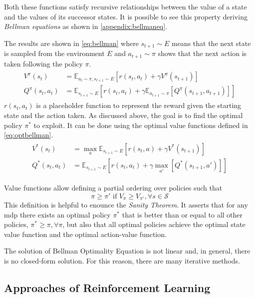 Both these functions satisfy recursive relationships between the value of a state and the values of its successor states. It is possible to see this property deriving \textit{Bellman equations} as shown in \vref{appendix:bellmaneq}.

The results are shown in \vref{eq:bellman} where $s_{t+1}\sim \mathit{E}$ means that the next state is sampled from the environment $E$ and $a_{t+1}\sim \pi$ shows that the next action is taken following the policy $\pi$.
\begin{align} \label{eq:bellman}
	\begin{split}
V^\pi(s_t) &= \mathbb{E}_{a_t \sim \pi, s_{t+1} \sim E}[r(s_t, a_t) + \gamma V^\pi(s_{t+1})] \\
Q^\pi(s_t,a_t) &= \mathbb{E}_{s_{t+1} \sim E}[r(s_t, a_t) + \gamma \mathbb{E}_{ a_{t+1} \sim \pi}[Q^\pi(s_{t+1}, a_{t+1})]]
\end{split}
\end{align}
 $r(s_t, a_t)$ is a placeholder function to represent the reward given the starting state and the action taken.
As discussed above, the goal is to find the optimal policy $\pi^*$ to exploit. It can be done using the optimal value functions defined in \vref{eq:optbellman}. 
\begin{align} \label{eq:optbellman}
\begin{split}
V^*(s_t) &= \max_{a} \mathbb{E}_{s_{t+1} \sim E}[r(s_t, a) + \gamma V^*(s_{t+1})] \\
Q^*(s_t,a_t) &= \mathbb{E}_{s_{t+1} \sim E}[r(s_t, a_t) + \gamma \max_{a'}[Q^*(s_{t+1}, a')]]
\end{split}
\end{align}

Value functions allow defining a partial ordering over policies such that \[\pi \ge \pi' \text{ if } V_\pi \ge V_{\pi'},\forall s \in \mathcal{S}\]
This definition is helpful to enounce the \textit{Sanity Theorem}. It asserts that for any \acrshort{mdp} there exists an optimal policy $\pi^*$ that is better than or equal to all other policies, $\pi^* \ge \pi, \forall \pi$, but also that all optimal policies achieve the optimal state value function and the optimal action-value function.

The solution of Bellman Optimality Equation is not linear and, in general, there is no closed-form solution. For this reason, there are many iterative methods.

\subsection{Approaches of Reinforcement Learning}


